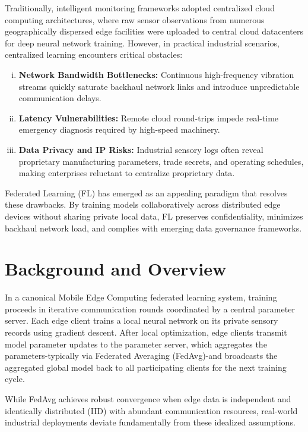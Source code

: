 \documentclass[12pt,a4paper]{report}
\begin{document}
Traditionally, intelligent monitoring frameworks adopted centralized cloud computing architectures, where raw sensor observations from numerous geographically dispersed edge facilities were uploaded to central cloud datacenters for deep neural network training. However, in practical industrial scenarios, centralized learning encounters critical obstacles:
\begin{enumerate}[(i)]
    \item \textbf{Network Bandwidth Bottlenecks:} Continuous high-frequency vibration streams quickly saturate backhaul network links and introduce unpredictable communication delays.
    \item \textbf{Latency Vulnerabilities:} Remote cloud round-trips impede real-time emergency diagnosis required by high-speed machinery.
    \item \textbf{Data Privacy and IP Risks:} Industrial sensory logs often reveal proprietary manufacturing parameters, trade secrets, and operating schedules, making enterprises reluctant to centralize proprietary data.
\end{enumerate}

Federated Learning (FL) has emerged as an appealing paradigm that resolves these drawbacks. By training models collaboratively across distributed edge devices without sharing private local data, FL preserves confidentiality, minimizes backhaul network load, and complies with emerging data governance frameworks.

\section{Background and Overview}
In a canonical Mobile Edge Computing federated learning system, training proceeds in iterative communication rounds coordinated by a central parameter server. Each edge client trains a local neural network on its private sensory records using gradient descent. After local optimization, edge clients transmit model parameter updates to the parameter server, which aggregates the parameters-typically via Federated Averaging (FedAvg)-and broadcasts the aggregated global model back to all participating clients for the next training cycle.

While FedAvg achieves robust convergence when edge data is independent and identically distributed (IID) with abundant communication resources, real-world industrial deployments deviate fundamentally from these idealized assumptions.
\end{document}

